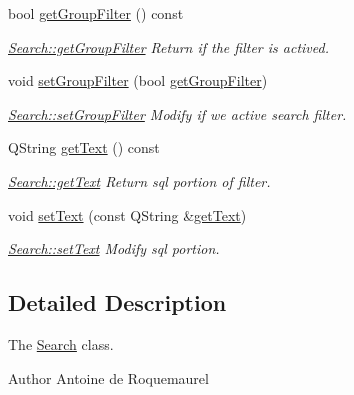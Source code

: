 \begin{DoxyCompactItemize}
bool \hyperlink{classModels_1_1Search_a2f5ee925709a654cedef85732e448438}{get\+Group\+Filter} () const 
\begin{DoxyCompactList}\small\item\em \hyperlink{classModels_1_1Search_a2f5ee925709a654cedef85732e448438}{Search\+::get\+Group\+Filter} Return if the filter is actived. \end{DoxyCompactList}\item 
void \hyperlink{classModels_1_1Search_a5feb06679973719e31007e659c08cc06}{set\+Group\+Filter} (bool \hyperlink{classModels_1_1Search_a2f5ee925709a654cedef85732e448438}{get\+Group\+Filter})
\begin{DoxyCompactList}\small\item\em \hyperlink{classModels_1_1Search_a5feb06679973719e31007e659c08cc06}{Search\+::set\+Group\+Filter} Modify if we active search filter. \end{DoxyCompactList}\item 
Q\+String \hyperlink{classModels_1_1Search_a30d4355f72278e6e466dc64208947f8b}{get\+Text} () const 
\begin{DoxyCompactList}\small\item\em \hyperlink{classModels_1_1Search_a30d4355f72278e6e466dc64208947f8b}{Search\+::get\+Text} Return sql portion of filter. \end{DoxyCompactList}\item 
void \hyperlink{classModels_1_1Search_a1bd00e3da5d5e10b4bec6579fb1c8bfa}{set\+Text} (const Q\+String \&\hyperlink{classModels_1_1Search_a30d4355f72278e6e466dc64208947f8b}{get\+Text})
\begin{DoxyCompactList}\small\item\em \hyperlink{classModels_1_1Search_a1bd00e3da5d5e10b4bec6579fb1c8bfa}{Search\+::set\+Text} Modify sql portion. \end{DoxyCompactList}\end{DoxyCompactItemize}


\subsection{Detailed Description}
The \hyperlink{classModels_1_1Search}{Search} class. 

\begin{DoxyAuthor}{Author}
Antoine de Roquemaurel 
\end{DoxyAuthor}


